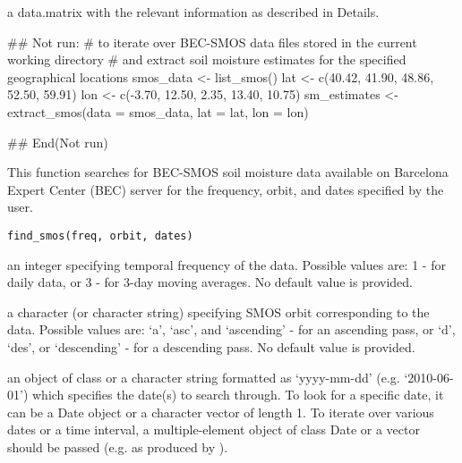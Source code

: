 \documentclass[a4paper]{book}
\begin{document}
%
\begin{Value}
a data.matrix with the relevant information as described in Details.
\end{Value}
%
\begin{Examples}
\begin{ExampleCode}
## Not run: 
# to iterate over BEC-SMOS data files stored in the current working directory
# and extract soil moisture estimates for the specified geographical locations
smos_data <- list_smos()
lat <- c(40.42, 41.90, 48.86, 52.50, 59.91)
lon <- c(-3.70, 12.50, 2.35, 13.40, 10.75)
sm_estimates <- extract_smos(data = smos_data, lat = lat, lon = lon)

## End(Not run)

\end{ExampleCode}
\end{Examples}
%
\begin{Description}
This function searches for BEC-SMOS soil moisture data available on Barcelona
Expert Center (BEC) server for the frequency, orbit, and dates specified by
the user.
\end{Description}
%
\begin{Usage}
\begin{verbatim}
find_smos(freq, orbit, dates)
\end{verbatim}
\end{Usage}
%
\begin{Arguments}
\begin{ldescription}
\item[\code{freq}] an integer specifying temporal frequency of the data. Possible
values are: 1 - for daily data, or 3 - for 3-day moving averages. No
default value is provided.

\item[\code{orbit}] a character (or character string) specifying SMOS orbit
corresponding to the data. Possible values are: ‘a’, ‘asc’, and ‘ascending’ -
for an ascending pass, or ‘d’, ‘des’, or ‘descending’ - for a descending
pass. No default value is provided.

\item[\code{dates}] an object of class  or a character string formatted
as ‘yyyy-mm-dd’ (e.g. ‘2010-06-01’) which specifies the date(s) to search
through. To look for a specific date, it can be a Date object or a character
vector of length 1. To iterate over various dates or a time interval, a
multiple-element object of class Date or a vector should be passed (e.g. as
produced by ).
\end{ldescription}
\end{Arguments}
\end{document}
